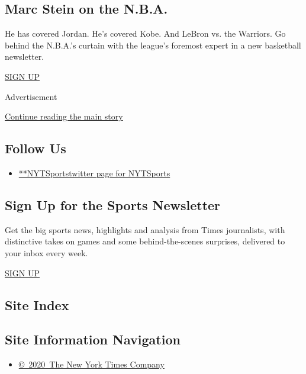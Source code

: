 \hypertarget{marc-stein-on-the-nba}{%
\subsection{Marc Stein on the N.B.A.}\label{marc-stein-on-the-nba}}

He has covered Jordan. He's covered Kobe. And LeBron vs. the Warriors.
Go behind the N.B.A.'s curtain with the league's foremost expert in a
new basketball newsletter.

\href{/newsletters/signup/MSB}{SIGN UP}

Advertisement

\protect\hyperlink{after-mktg}{Continue reading the main story}

\hypertarget{follow-us}{%
\subsection{Follow Us}\label{follow-us}}

\begin{itemize}
\tightlist
\item
  \href{https://twitter.com/NYTSports}{**NYTSportstwitter page for
  NYTSports}
\end{itemize}

\hypertarget{sign-up-for-the-sports-newsletter}{%
\subsection{Sign Up for the Sports
Newsletter}\label{sign-up-for-the-sports-newsletter}}

Get the big sports news, highlights and analysis from Times journalists,
with distinctive takes on games and some behind-the-scenes surprises,
delivered to your inbox every week.

\href{/newsletters/signup/SP}{SIGN UP}

\hypertarget{site-index}{%
\subsection{Site Index}\label{site-index}}

\hypertarget{site-information-navigation}{%
\subsection{Site Information
Navigation}\label{site-information-navigation}}

\begin{itemize}
\tightlist
\item
  \href{https://help.nytimes3xbfgragh.onion/hc/en-us/articles/115014792127-Copyright-notice}{©~2020~The
  New York Times Company}
\end{itemize}

